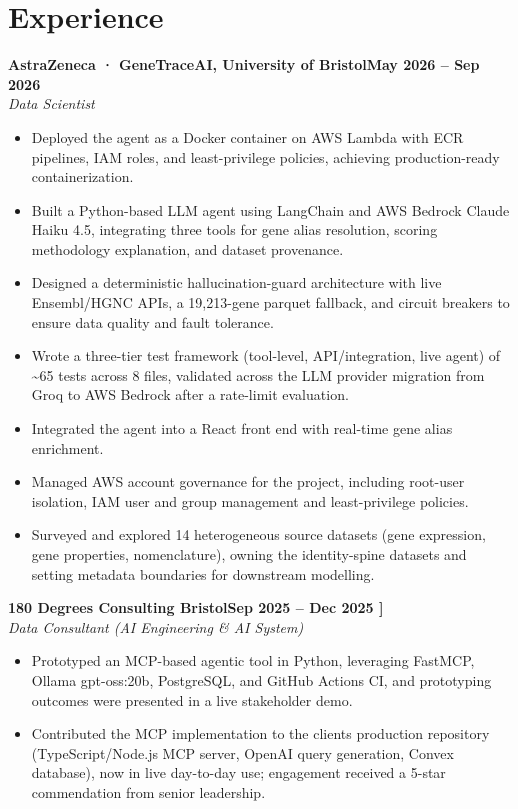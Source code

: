 \documentclass[a4paper,11pt]{article}
\newcommand{\entry}[4]{\needspace{4\baselineskip}\noindent\textbf{#1}\hfill\textbf{#2}\\ \textit{#3}\hfill\textit{#4}\par}
\begin{document}
\section{Experience}
\entry{AstraZeneca · GeneTraceAI, University of Bristol}{May 2026 – Sep 2026}{Data Scientist}{}
\begin{itemize}
  \item Deployed the agent as a Docker container on AWS Lambda with ECR pipelines, IAM roles, and least-privilege policies, achieving production-ready containerization.
  \item Built a Python-based LLM agent using LangChain and AWS Bedrock Claude Haiku 4.5, integrating three tools for gene alias resolution, scoring methodology explanation, and dataset provenance.
  \item Designed a deterministic hallucination-guard architecture with live Ensembl/HGNC APIs, a 19,213-gene parquet fallback, and circuit breakers to ensure data quality and fault tolerance.
  \item Wrote a three-tier test framework (tool-level, API/integration, live agent) of \textasciitilde{}65 tests across 8 files, validated across the LLM provider migration from Groq to AWS Bedrock after a rate-limit evaluation.
  \item Integrated the agent into a React front end with real-time gene alias enrichment.
  \item Managed AWS account governance for the project, including root-user isolation, IAM user and group management and least-privilege policies.
  \item Surveyed and explored 14 heterogeneous source datasets (gene expression, gene properties, nomenclature), owning the identity-spine datasets and setting metadata boundaries for downstream modelling.
\end{itemize}
\vspace{4pt}
\entry{180 Degrees Consulting Bristol}{Sep 2025 – Dec 2025   ]}{Data Consultant (AI Engineering \& AI System)}{}
\begin{itemize}
  \item Prototyped an MCP-based agentic tool in Python, leveraging FastMCP, Ollama gpt-oss:20b, PostgreSQL, and GitHub Actions CI, and prototyping outcomes were presented in a live stakeholder demo.
  \item Contributed the MCP implementation to the client\textquotesingle{}s production repository (TypeScript/Node.js MCP server, OpenAI query generation, Convex database), now in live day-to-day use; engagement received a 5-star commendation from senior leadership.
\end{itemize}
\end{document}
